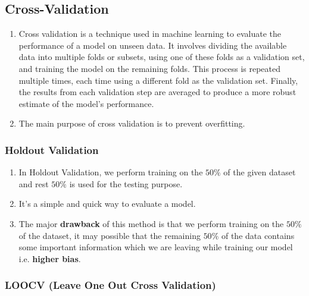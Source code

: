 \subsection{Cross-Validation \cite{dnn-1,geeksforgeeks/cross-validation-machine-learning/}}\label{Cross-Validation}

\begin{enumerate}
    \item Cross validation is a technique used in machine learning to evaluate the performance of a model on unseen data. It involves dividing the available data into multiple folds or subsets, using one of these folds as a validation set, and training the model on the remaining folds. This process is repeated multiple times, each time using a different fold as the validation set. Finally, the results from each validation step are averaged to produce a more robust estimate of the model’s performance. \cite{geeksforgeeks/cross-validation-machine-learning/}

    \item The main purpose of cross validation is to prevent overfitting.
\end{enumerate}

\subsubsection{Holdout Validation \cite{geeksforgeeks/cross-validation-machine-learning/}} \label{Cross-Validation: Holdout Validation}

\begin{enumerate}
    \item In Holdout Validation, we perform training on the $50\%$ of the given dataset and rest $50\%$ is used for the testing purpose. 
    
    \item It’s a simple and quick way to evaluate a model. 
    
    \item The major \textbf{drawback} of this method is that we perform training on the $50\%$ of the dataset, it may possible that the remaining $50\%$ of the data contains some important information which we are leaving while training our model i.e. \textbf{higher bias}.

\end{enumerate}


\subsubsection{LOOCV (Leave One Out Cross Validation) \cite{geeksforgeeks/cross-validation-machine-learning/}} \label{Cross-Validation: LOOCV (Leave One Out Cross Validation)}

